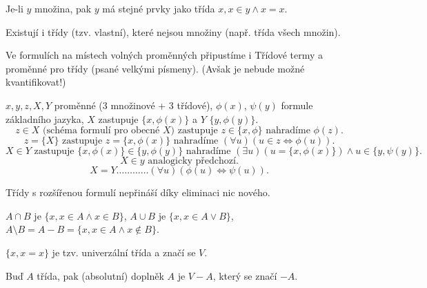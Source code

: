 \documentclass[12pt]{article}                   %
\begin{document}
        \begin{poznamka}
            Je-li $y$ množina, pak $y$ má stejné prvky jako třída ${x, x \in y \land x = x}$.
        \end{poznamka}

        \begin{poznamka}
            Existují i třídy (tzv. vlastní), které nejsou množiny (např. třída všech množin).
        \end{poznamka}

        \begin{definice}
            Ve formulích na místech volných proměnných připustíme i Třídové termy a proměnné pro třídy (psané velkými písmeny). (Avšak je nebude možné kvantifikovat!)
        \end{definice}

        \begin{definice}
            $x, y, z, X, Y$ proměnné (3 množinové + 3 třídové), $\phi(x)$, $\psi(y)$ formule základního jazyka, $X$ zastupuje $\{x, \phi(x)\}$ a $Y$ $\{y, \phi(y)\}$.
            $$ z \in X \text{ (schéma formulí pro obecné $X$) zastupuje } z \in \{x, \phi\} \text{ nahradíme } \phi(z). $$
            $$ z = \{X\} \text{ zastupuje } z = \{x, \phi(x)\} \text{ nahradíme } (\forall u)(u \in z \Leftrightarrow \phi(u)). $$
            $$ X \in Y \text{ zastupuje } \{x, \phi(x)\} \in \{y, \phi(y)\} \text{ nahradíme } (\exists u)(u = \{x, \phi(x)\}) \land u \in \{y, \psi(y)\}. $$ 
            $$ X \in y \text{ analogicky předchozí.} $$
            $$ X = Y … … … … (\forall u)(\phi(u) \Leftrightarrow \psi(u)). $$ 
        \end{definice}

        \begin{poznamka}
            Třídy s rozšířenou formulí nepřináší díky eliminaci nic nového.
        \end{poznamka}

        \begin{definice}
            $A \cap B$ je $\{x, x \in A \land x \in B\}$, $A \cup B$ je $\{x, x \in A \lor B\}$, $A \setminus B = A - B = \{x, x \in A \land x \notin B\}$.
        \end{definice}

        \begin{definice}
            $\{x, x = x\}$ je tzv. univerzální třída a značí se $V$.

            Buď $A$ třída, pak (absolutní) doplněk $A$ je $V - A$, který se značí $-A$.
        \end{definice}
\end{document}

